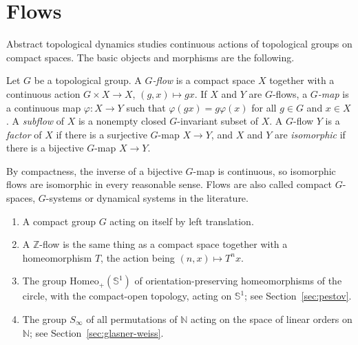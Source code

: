 \section{Flows}\label{sec:flows}

Abstract topological dynamics studies continuous actions of topological groups
on compact spaces. The basic objects and morphisms are the following.

\begin{definition}[Flow]\label{def:flow}
Let $G$ be a topological group. A \emph{$G$-flow} is a compact space $X$
together with a continuous action $G\times X\to X$, $(g,x)\mapsto gx$. If $X$
and $Y$ are $G$-flows, a \emph{$G$-map} is a continuous map
$\varphi\colon X\to Y$ such that $\varphi(gx)=g\varphi(x)$ for all $g\in G$
and $x\in X$. A \emph{subflow} of $X$ is a nonempty closed $G$-invariant
subset of $X$. A $G$-flow $Y$ is a \emph{factor} of $X$ if there is a
surjective $G$-map $X\to Y$, and $X$ and $Y$ are \emph{isomorphic} if there is
a bijective $G$-map $X\to Y$.
\end{definition}

\begin{remark}\label{rem:flow-terminology}
By compactness, the inverse of a bijective $G$-map is continuous, so
isomorphic flows are isomorphic in every reasonable sense. Flows are also
called compact $G$-spaces, $G$-systems or dynamical systems in the literature.
\end{remark}

\begin{example}\label{ex:flows}
\begin{enumerate}
\item A compact group $G$ acting on itself by left translation.
\item A $\mathbb{Z}$-flow is the same thing as a compact space together with
  a homeomorphism $T$, the action being $(n,x)\mapsto T^n x$.
\item The group $\mathrm{Homeo}_+(\mathbb{S}^1)$ of orientation-preserving
  homeomorphisms of the circle, with the compact-open topology, acting on
  $\mathbb{S}^1$; see Section~\ref{sec:pestov}.
\item The group $S_\infty$ of all permutations of $\mathbb{N}$ acting on the
  space of linear orders on $\mathbb{N}$; see Section~\ref{sec:glasner-weiss}.
\end{enumerate}
\end{example}
